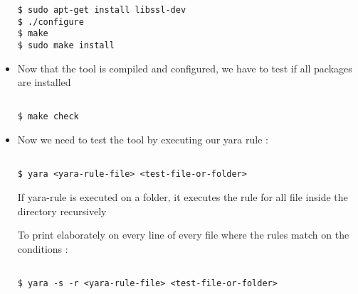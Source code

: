 \begin{itemize}
\begin{verbatim}
$ sudo apt-get install libssl-dev
$ ./configure
$ make
$ sudo make install

\end{verbatim}

\item Now that the tool is compiled and configured, we have to test if all packages are installed


\begin{verbatim}

$ make check

\end{verbatim}

\item Now we need to test the tool by executing our yara rule :


\begin{verbatim}

$ yara <yara-rule-file> <test-file-or-folder>

\end{verbatim}

If yara-rule is executed on a folder, it executes the rule for all file inside the directory recursively

To print elaborately on every line of every file where the rules match on the conditions :

\begin{verbatim}

$ yara -s -r <yara-rule-file> <test-file-or-folder>

\end{verbatim}

\end{itemize}
